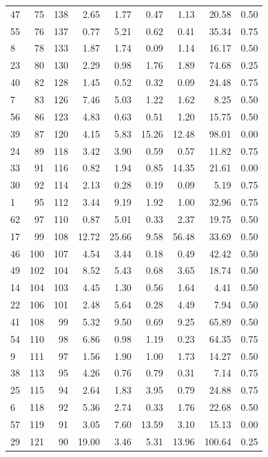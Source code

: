 \begin{tabular}{@{}l r r r r r r r l@{}}
47 & 75 & 138 & 2.65 & 1.77 & 0.47 & 1.13 & 20.58 & 0.50 \\
55 & 76 & 137 & 0.77 & 5.21 & 0.62 & 0.41 & 35.34 & 0.75 \\
8 & 78 & 133 & 1.87 & 1.74 & 0.09 & 1.14 & 16.17 & 0.50 \\
23 & 80 & 130 & 2.29 & 0.98 & 1.76 & 1.89 & 74.68 & 0.25 \\
40 & 82 & 128 & 1.45 & 0.52 & 0.32 & 0.09 & 24.48 & 0.75 \\
7 & 83 & 126 & 7.46 & 5.03 & 1.22 & 1.62 & 8.25 & 0.50 \\
56 & 86 & 123 & 4.83 & 0.63 & 0.51 & 1.20 & 15.75 & 0.50 \\
39 & 87 & 120 & 4.15 & 5.83 & 15.26 & 12.48 & 98.01 & 0.00 \\
24 & 89 & 118 & 3.42 & 3.90 & 0.59 & 0.57 & 11.82 & 0.75 \\
33 & 91 & 116 & 0.82 & 1.94 & 0.85 & 14.35 & 21.61 & 0.00 \\
30 & 92 & 114 & 2.13 & 0.28 & 0.19 & 0.09 & 5.19 & 0.75 \\
1 & 95 & 112 & 3.44 & 9.19 & 1.92 & 1.00 & 32.96 & 0.75 \\
62 & 97 & 110 & 0.87 & 5.01 & 0.33 & 2.37 & 19.75 & 0.50 \\
17 & 99 & 108 & 12.72 & 25.66 & 9.58 & 56.48 & 33.69 & 0.50 \\
46 & 100 & 107 & 4.54 & 3.44 & 0.18 & 0.49 & 42.42 & 0.50 \\
49 & 102 & 104 & 8.52 & 5.43 & 0.68 & 3.65 & 18.74 & 0.50 \\
14 & 104 & 103 & 4.45 & 1.30 & 0.56 & 1.64 & 4.41 & 0.50 \\
22 & 106 & 101 & 2.48 & 5.64 & 0.28 & 4.49 & 7.94 & 0.50 \\
41 & 108 & 99 & 5.32 & 9.50 & 0.69 & 9.25 & 65.89 & 0.50 \\
54 & 110 & 98 & 6.86 & 0.98 & 1.19 & 0.23 & 64.35 & 0.75 \\
9 & 111 & 97 & 1.56 & 1.90 & 1.00 & 1.73 & 14.27 & 0.50 \\
38 & 113 & 95 & 4.26 & 0.76 & 0.79 & 0.31 & 7.14 & 0.75 \\
25 & 115 & 94 & 2.64 & 1.83 & 3.95 & 0.79 & 24.88 & 0.75 \\
6 & 118 & 92 & 5.36 & 2.74 & 0.33 & 1.76 & 22.68 & 0.50 \\
57 & 119 & 91 & 3.05 & 7.60 & 13.59 & 3.10 & 15.13 & 0.00 \\
29 & 121 & 90 & 19.00 & 3.46 & 5.31 & 13.96 & 100.64 & 0.25 \\

\end{tabular}
